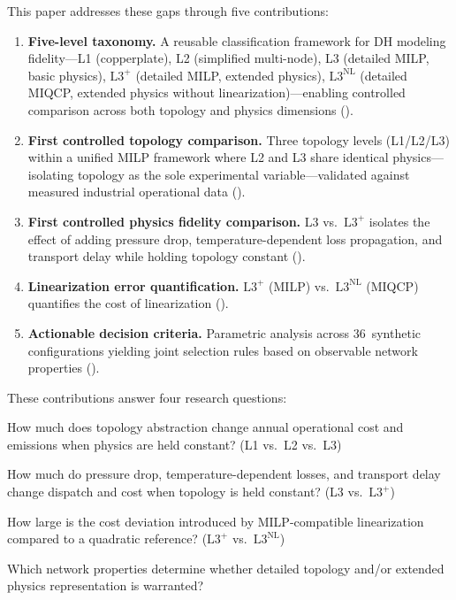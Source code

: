 \documentclass[review,3p]{elsarticle}
\newcommand{\Lplus}{\mathrm{L3}^{+}}
\newcommand{\Lnl}{\mathrm{L3}^{\mathrm{NL}}}
\begin{document}
This paper addresses these gaps through five contributions:
%
\begin{enumerate}
  \item \textbf{Five-level taxonomy.} A reusable classification
        framework for DH modeling fidelity---L1 (copperplate), L2
        (simplified multi-node), L3 (detailed MILP, basic physics),
        $\Lplus$ (detailed MILP, extended physics), $\Lnl$ (detailed
        MIQCP, extended physics without linearization)---enabling
        controlled comparison across both topology and physics
        dimensions ().

  \item \textbf{First controlled topology comparison.} Three topology
        levels (L1/L2/L3) within a unified MILP framework where L2
        and L3 share identical physics---isolating topology as the
        sole experimental variable---validated against measured
        industrial operational data ().

  \item \textbf{First controlled physics fidelity comparison.}
        L3 vs.\ $\Lplus$ isolates the effect of adding pressure drop,
        temperature-dependent loss propagation, and transport delay
        while holding topology constant
        ().

  \item \textbf{Linearization error quantification.}
        $\Lplus$ (MILP) vs.\ $\Lnl$ (MIQCP) quantifies the cost of
        linearization ().

  \item \textbf{Actionable decision criteria.} Parametric analysis
        across 36~synthetic configurations yielding joint selection
        rules based on observable network properties
        ().
\end{enumerate}

These contributions answer four research questions:
%
\begin{description}[style=nextline, nosep, leftmargin=1.5em]
  \item[RQ1 --- Topology effect:]
    How much does topology abstraction change annual operational cost
    and  emissions when physics are held constant?
    (L1 vs.\ L2 vs.\ L3)

  \item[RQ2 --- Physics fidelity effect:]
    How much do pressure drop, temperature-dependent losses, and
    transport delay change dispatch and cost when topology is held
    constant? (L3 vs.\ $\Lplus$)

  \item[RQ3 --- Linearization error:]
    How large is the cost deviation introduced by MILP-compatible
    linearization compared to a quadratic reference?
    ($\Lplus$ vs.\ $\Lnl$)

  \item[RQ4 --- Generalizability:]
    Which network properties determine whether detailed topology
    and/or extended physics representation is warranted?
\end{description}
\end{document}
